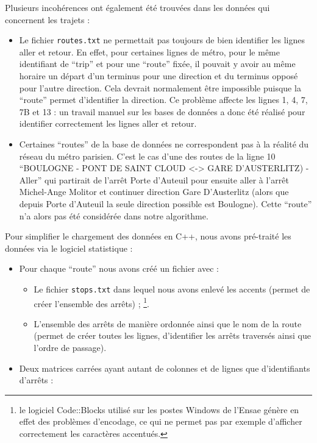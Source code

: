 \documentclass[,french]{article}
\providecommand{\tightlist}{%
  \setlength{\itemsep}{0pt}\setlength{\parskip}{0pt}}
\let\rmarkdownfootnote\footnote%
\def\footnote{\protect\rmarkdownfootnote}
\begin{document}
Plusieurs incohérences ont également été trouvées dans les données qui
concernent les trajets :

\begin{itemize}
\item
  Le fichier \texttt{routes.txt} ne permettait pas toujours de bien
  identifier les lignes aller et retour. En effet, pour certaines lignes
  de métro, pour le même identifiant de ``trip'' et pour une ``route''
  fixée, il pouvait y avoir au même horaire un départ d'un terminus pour
  une direction et du terminus opposé pour l'autre direction. Cela
  devrait normalement être impossible puisque la ``route'' permet
  d'identifier la direction. Ce problème affecte les lignes 1, 4, 7, 7B
  et 13 : un travail manuel sur les bases de données a donc été réalisé
  pour identifier correctement les lignes aller et retour.\\
\item
  Certaines ``routes'' de la base de données ne correspondent pas à la
  réalité du réseau du métro parisien. C'est le cas d'une des routes de
  la ligne 10 ``BOULOGNE - PONT DE SAINT CLOUD
  \textless{}-\textgreater{} GARE D'AUSTERLITZ) - Aller'' qui partirait
  de l'arrêt Porte d'Auteuil pour ensuite aller à l'arrêt Michel-Ange
  Molitor et continuer direction Gare D'Austerlitz (alors que depuis
  Porte d'Auteuil la seule direction possible est Boulogne). Cette
  ``route'' n'a alors pas été considérée dans notre algorithme.
\end{itemize}

Pour simplifier le chargement des données en C++, nous avons pré-traité
les données via le logiciel statistique \faRProject :

\begin{itemize}
\tightlist
\item
  Pour chaque ``route'' nous avons créé un fichier avec :

  \begin{itemize}
  \item
    Le fichier \texttt{stops.txt} dans lequel nous avons enlevé les
    accents (permet de créer l'ensemble des arrêts) ; \footnote{le
      logiciel Code::Blocks utilisé sur les postes Windows de l'Ensae
      génère en effet des problèmes d'encodage, ce qui ne permet pas par
      exemple d'afficher correctement les caractères accentués.}.
  \item
    L'ensemble des arrêts de manière ordonnée ainsi que le nom de la
    route (permet de créer toutes les lignes, d'identifier les arrêts
    traversés ainsi que l'ordre de passage). 
  \end{itemize}
\item
  Deux matrices carrées ayant autant de colonnes et de lignes que
  d'identifiants d'arrêts :
\end{itemize}
\end{document}
